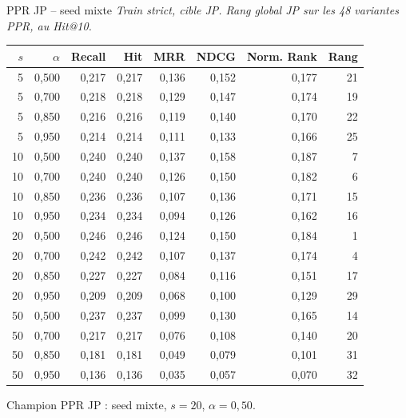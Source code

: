 \documentclass[aspectratio=169,10pt]{beamer}
\newcommand{\keybox}[1]{%
  \begin{center}
  \colorbox{accentsoft}{\parbox{0.92\linewidth}{\centering #1}}
  \end{center}}
\begin{document}
\begin{frame}{PPR JP -- seed mixte}
  \tiny
  \textit{Train strict, cible JP. Rang global JP sur les 48 variantes PPR, au Hit@10.}

  \vspace{0.15em}
  \begin{center}
  \renewcommand{\arraystretch}{0.95}
  \setlength{\tabcolsep}{3pt}
  \begin{tabular}{@{}r r r r r r r r@{}}
    \toprule
    $s$ & $\alpha$ & Recall & Hit & MRR & NDCG & Norm. Rank & Rang \\
    \midrule
    5 & 0,500 & 0,217 & 0,217 & 0,136 & 0,152 & 0,177 & 21 \\
    5 & 0,700 & 0,218 & 0,218 & 0,129 & 0,147 & 0,174 & 19 \\
    5 & 0,850 & 0,216 & 0,216 & 0,119 & 0,140 & 0,170 & 22 \\
    5 & 0,950 & 0,214 & 0,214 & 0,111 & 0,133 & 0,166 & 25 \\
    10 & 0,500 & 0,240 & 0,240 & 0,137 & 0,158 & 0,187 & 7 \\
    10 & 0,700 & 0,240 & 0,240 & 0,126 & 0,150 & 0,182 & 6 \\
    10 & 0,850 & 0,236 & 0,236 & 0,107 & 0,136 & 0,171 & 15 \\
    10 & 0,950 & 0,234 & 0,234 & 0,094 & 0,126 & 0,162 & 16 \\
    \rowcolor{green!10}
    20 & 0,500 & 0,246 & 0,246 & 0,124 & 0,150 & 0,184 & 1 \\
    20 & 0,700 & 0,242 & 0,242 & 0,107 & 0,137 & 0,174 & 4 \\
    20 & 0,850 & 0,227 & 0,227 & 0,084 & 0,116 & 0,151 & 17 \\
    20 & 0,950 & 0,209 & 0,209 & 0,068 & 0,100 & 0,129 & 29 \\
    50 & 0,500 & 0,237 & 0,237 & 0,099 & 0,130 & 0,165 & 14 \\
    50 & 0,700 & 0,217 & 0,217 & 0,076 & 0,108 & 0,140 & 20 \\
    50 & 0,850 & 0,181 & 0,181 & 0,049 & 0,079 & 0,101 & 31 \\
    50 & 0,950 & 0,136 & 0,136 & 0,035 & 0,057 & 0,070 & 32 \\
    \bottomrule
  \end{tabular}
  \end{center}

  \vspace{0.2em}
  \keybox{\scriptsize Champion PPR JP : seed mixte, $s=20$, $\alpha=0{,}50$.}
\end{frame}
\end{document}
